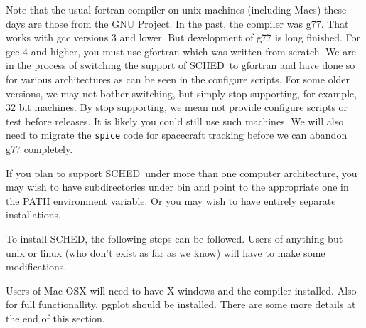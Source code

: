 \documentclass{report}
\newcommand{\sched}{{\sc SCHED}}
\newcommand{\schedb}{{\sc SCHED~}}
\begin{document}
Note that the usual fortran compiler on unix machines (including Macs)
these days are those from the GNU Project.  In the past, the compiler
was g77.  That works with gcc versions 3 and lower.  But development
of g77 is long finished.  For gcc 4 and higher, you must use gfortran
which was written from scratch.  We are in the process of switching
the support of \schedb to gfortran and have done so for various
architectures as can be seen in the configure scripts.  For some older
versions, we may not bother switching, but simply stop supporting, for
example, 32 bit machines.  By stop supporting, we mean not provide
configure scripts or test before releases.  It is likely you could
still use such machines.  We will also need to migrate the {\tt spice}
code for spacecraft tracking before we can abandon g77 completely.

If you plan to support \schedb under more than one computer
architecture, you may wish to have subdirectories under bin and point
to the appropriate one in the PATH environment variable.  Or you may
wish to have entirely separate installations.

To install \sched, the following steps can be followed.  Users of
anything but unix or linux (who don't exist as far as we know) will
have to make some modifications.

Users of Mac OSX will need to have X windows and the compiler installed.
Also for full functionallity, pgplot should be installed.  There are some
more details at the end of this section.
\end{document}
